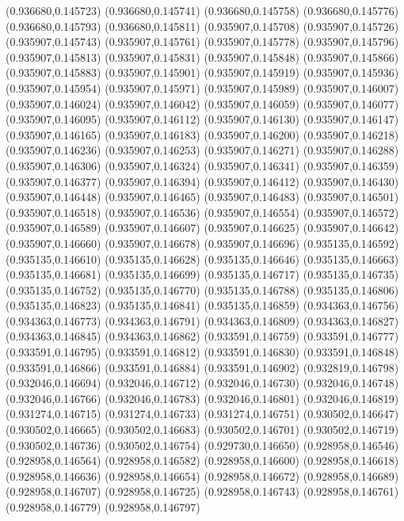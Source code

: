 (0.936680,0.145723)
(0.936680,0.145741)
(0.936680,0.145758)
(0.936680,0.145776)
(0.936680,0.145793)
(0.936680,0.145811)
(0.935907,0.145708)
(0.935907,0.145726)
(0.935907,0.145743)
(0.935907,0.145761)
(0.935907,0.145778)
(0.935907,0.145796)
(0.935907,0.145813)
(0.935907,0.145831)
(0.935907,0.145848)
(0.935907,0.145866)
(0.935907,0.145883)
(0.935907,0.145901)
(0.935907,0.145919)
(0.935907,0.145936)
(0.935907,0.145954)
(0.935907,0.145971)
(0.935907,0.145989)
(0.935907,0.146007)
(0.935907,0.146024)
(0.935907,0.146042)
(0.935907,0.146059)
(0.935907,0.146077)
(0.935907,0.146095)
(0.935907,0.146112)
(0.935907,0.146130)
(0.935907,0.146147)
(0.935907,0.146165)
(0.935907,0.146183)
(0.935907,0.146200)
(0.935907,0.146218)
(0.935907,0.146236)
(0.935907,0.146253)
(0.935907,0.146271)
(0.935907,0.146288)
(0.935907,0.146306)
(0.935907,0.146324)
(0.935907,0.146341)
(0.935907,0.146359)
(0.935907,0.146377)
(0.935907,0.146394)
(0.935907,0.146412)
(0.935907,0.146430)
(0.935907,0.146448)
(0.935907,0.146465)
(0.935907,0.146483)
(0.935907,0.146501)
(0.935907,0.146518)
(0.935907,0.146536)
(0.935907,0.146554)
(0.935907,0.146572)
(0.935907,0.146589)
(0.935907,0.146607)
(0.935907,0.146625)
(0.935907,0.146642)
(0.935907,0.146660)
(0.935907,0.146678)
(0.935907,0.146696)
(0.935135,0.146592)
(0.935135,0.146610)
(0.935135,0.146628)
(0.935135,0.146646)
(0.935135,0.146663)
(0.935135,0.146681)
(0.935135,0.146699)
(0.935135,0.146717)
(0.935135,0.146735)
(0.935135,0.146752)
(0.935135,0.146770)
(0.935135,0.146788)
(0.935135,0.146806)
(0.935135,0.146823)
(0.935135,0.146841)
(0.935135,0.146859)
(0.934363,0.146756)
(0.934363,0.146773)
(0.934363,0.146791)
(0.934363,0.146809)
(0.934363,0.146827)
(0.934363,0.146845)
(0.934363,0.146862)
(0.933591,0.146759)
(0.933591,0.146777)
(0.933591,0.146795)
(0.933591,0.146812)
(0.933591,0.146830)
(0.933591,0.146848)
(0.933591,0.146866)
(0.933591,0.146884)
(0.933591,0.146902)
(0.932819,0.146798)
(0.932046,0.146694)
(0.932046,0.146712)
(0.932046,0.146730)
(0.932046,0.146748)
(0.932046,0.146766)
(0.932046,0.146783)
(0.932046,0.146801)
(0.932046,0.146819)
(0.931274,0.146715)
(0.931274,0.146733)
(0.931274,0.146751)
(0.930502,0.146647)
(0.930502,0.146665)
(0.930502,0.146683)
(0.930502,0.146701)
(0.930502,0.146719)
(0.930502,0.146736)
(0.930502,0.146754)
(0.929730,0.146650)
(0.928958,0.146546)
(0.928958,0.146564)
(0.928958,0.146582)
(0.928958,0.146600)
(0.928958,0.146618)
(0.928958,0.146636)
(0.928958,0.146654)
(0.928958,0.146672)
(0.928958,0.146689)
(0.928958,0.146707)
(0.928958,0.146725)
(0.928958,0.146743)
(0.928958,0.146761)
(0.928958,0.146779)
(0.928958,0.146797)
